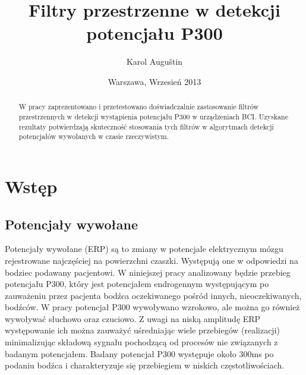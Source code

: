 \documentclass[licencjacka,openright]{pracamgr}
\author{ Karol Auguštin }
\title{ Filtry przestrzenne w detekcji potencjału P300 }
\date{Warszawa, Wrzesień 2013}
\begin{document}
\let\cleardoublepage\clearpage
\maketitle
\begin{abstract}
\par W pracy zaprezentowano i przetestowano doświadczalnie zastosowanie filtrów przestrzennych w detekcji wystąpienia potencjału P300 w urządzeniach BCI. Uzyskane rezultaty potwierdzają skuteczność stosowania tych filtrów w algorytmach detekcji potencjałów wywołanych w czasie rzeczywistym.
\end{abstract}
\tableofcontents


\chapter{Wstęp}
\section{Potencjały wywołane}
\label{potencjaly}
Potencjały wywołane (ERP) są to zmiany w potencjale elektrycznym mózgu rejestrowane najczęściej na powierzchni czaszki. Występują one w odpowiedzi na bodziec podawany pacjentowi. W niniejszej pracy analizowany będzie przebieg potencjału P300, który jest potencjałem endrogennym występującym po zauważeniu przez pacjenta bodźca oczekiwanego pośród innych, nieoczekiwanych, bodźców. W pracy potencjał P300 wywoływano wzrokowo, ale można go również wywoływać słuchowo oraz czuciowo. 
Z uwagi na niską amplitudę ERP występowanie ich można zauważyć uśredniając wiele przebiegów (realizacji) minimalizując składową sygnału pochodzącą od procesów nie związanych z badanym potencjałem.
Badany potencjał P300 występuje około 300ms po podaniu bodźca i charakteryzuje się przebiegiem w niskich częstotliwościach. 
\end{document}

